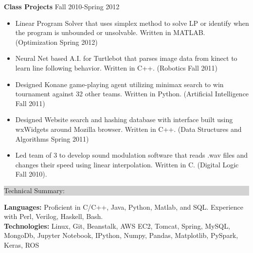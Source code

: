 \documentclass{article} %
\newcommand{\rsection}[1]{
\hspace{-0.4cm}
\colorbox{lightgrey}{
\begin{minipage}{1.07\linewidth}
\vspace{0.25cm}
\fontsize{14pt}{16pt}\selectfont #1 
\vspace{0.15cm}
\end{minipage}
}
\vspace*{-0.2cm}
}
\newcommand{\rjob}[2]{
\vspace{0.1cm}
\hspace*{-0.3cm}  
{\fontsize{10pt}{12pt}\selectfont #1} \hfill #2 
\vspace*{0.1cm} 
\hspace*{-1.2cm}
}
\newenvironment{ritemize}{
\hspace*{-0.8cm} 
\begin{minipage}{1.05\linewidth}
\begin{itemize}
}{
\end{itemize}
\end{minipage}
\vspace{-0.2cm}
}
\newcommand{\ritem}{
\item[-]
}
\begin{document}
\rjob{\textbf{Class Projects}}{Fall 2010-Spring 2012}\\
\begin{ritemize}
\ritem Linear Program Solver that uses simplex method to solve LP or identify when the program is unbounded or unsolvable. Written in MATLAB. (Optimization Spring 2012)
\ritem Neural Net based A.I. for Turtlebot that parses image data from kinect to learn line following behavior. Written in C++. (Robotics Fall 2011)
\ritem Designed Konane game-playing agent utilizing minimax search to win tournament against 32 other teams. Written in Python. (Artificial Intelligence Fall 2011)
\ritem Designed Website search and hashing database with interface built using  wxWidgets around Mozilla browser. Written in C++. (Data Structures and Algorithms Spring 2011)
\ritem Led team of 3 to develop sound modulation software that reads .wav files and changes their speed using linear interpolation. Written in C. (Digital Logic Fall 2010).
\end{ritemize}




\rsection{Technical Summary:}

\hspace*{-0.3cm}
\textbf{Languages:} Proficient in C/C++, Java, Python, Matlab, and SQL. Experience with Perl, Verilog, Haskell, Bash. \\
\hspace*{-0.3cm}
\textbf{Technologies:} Linux, Git, Beanstalk, AWS EC2, Tomcat, Spring, MySQL, MongoDb, Jupyter Notebook, IPython, Numpy, Pandas, Matplotlib, PySpark, Keras, ROS
\end{document}
